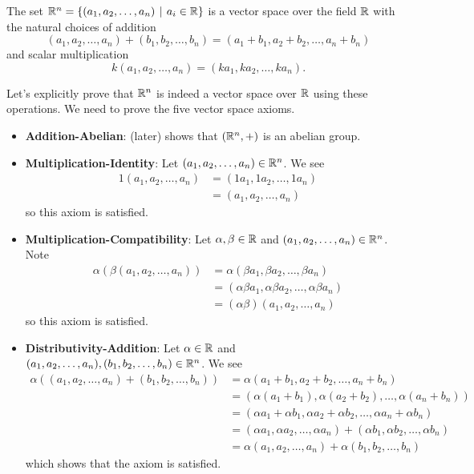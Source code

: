 \begin{example}\label{example-R^n-is-vector-space}
    The set $\R^n = \{(a_1, a_2, \dots, a_n) \vert a_i \in \R\}$ is a vector space over the field $\mathbb{R}$ with the natural choices of addition
    \[
        (a_1, a_2, \dots, a_n) + (b_1, b_2, \dots, b_n) = (a_1 + b_1, a_2 + b_2, \dots, a_n + b_n)
    \]
    and scalar multiplication
    \[
        k(a_1, a_2, \dots, a_n) = (ka_1, ka_2, \dots, ka_n).
    \]

    Let's explicitly prove that $\mathbb{R}^n$ is indeed a vector space over $\mathbb{R}$ using these operations. We need to prove the five vector space axioms.
    \begin{itemize}
        \item \textbf{Addition-Abelian}:  (later) shows that $(\mathbb{R}^n, +)$ is an abelian group.

        \item \textbf{Multiplication-Identity}: Let $(a_1, a_2, \dots, a_n) \in \mathbb{R}^n$. We see
        \begin{align*}
            1(a_1, a_2, \dots, a_n) &= (1a_1, 1a_2, \dots, 1a_n)\\
            &= (a_1, a_2, \dots, a_n)
        \end{align*}
        so this axiom is satisfied.

        \item \textbf{Multiplication-Compatibility}: Let $\alpha, \beta \in \mathbb{R}$ and $(a_1, a_2, \dots, a_n) \in \mathbb{R}^n$. Note
        \begin{align*}
            \alpha\left(\beta(a_1, a_2, \dots, a_n)\right) &= \alpha(\beta a_1, \beta a_2, \dots, \beta a_n)\\
            &= (\alpha\beta a_1, \alpha\beta a_2, \dots, \alpha\beta a_n)\\
            &= (\alpha\beta)(a_1, a_2, \dots, a_n)
        \end{align*}
        so this axiom is satisfied.

        \item \textbf{Distributivity-Addition}: Let $\alpha \in \mathbb{R}$ and $(a_1, a_2, \dots, a_n), (b_1, b_2, \dots, b_n) \in \mathbb{R}^n$. We see
        \begin{align*}
            \alpha\left((a_1, a_2, \dots, a_n) + (b_1, b_2, \dots, b_n)\right) &= \alpha(a_1 + b_1, a_2 + b_2, \dots, a_n + b_n)\\
            &= (\alpha(a_1 + b_1), \alpha(a_2 + b_2), \dots, \alpha(a_n + b_n))\\
            &= (\alpha a_1 + \alpha b_1, \alpha a_2 + \alpha b_2, \dots, \alpha a_n + \alpha b_n)\\
            &= (\alpha a_1, \alpha a_2, \dots, \alpha a_n) + (\alpha b_1, \alpha b_2, \dots, \alpha b_n)\\
            &= \alpha(a_1, a_2, \dots, a_n) + \alpha(b_1, b_2, \dots, b_n)
        \end{align*}
        which shows that the axiom is satisfied.


\end{itemize}
\end{example}
